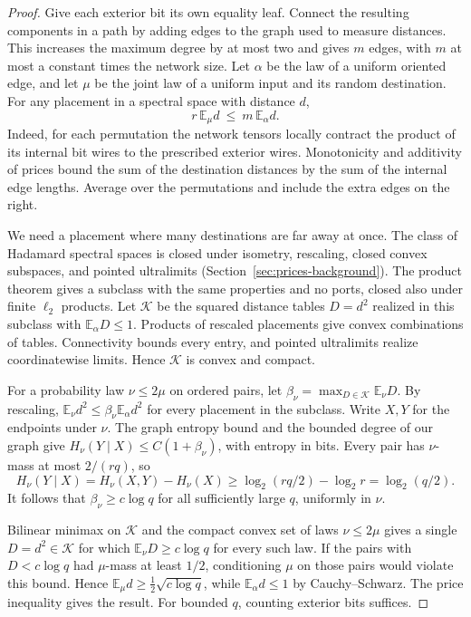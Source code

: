 \begin{proof}
Give each exterior bit its own equality leaf. Connect the resulting
components in a path by adding edges to the graph used to measure
distances. This increases the maximum degree by at most two and gives
\(m\) edges, with \(m\) at most a constant times the network size.
Let \(\alpha\) be the law of a uniform oriented edge, and let \(\mu\)
be the joint law of a uniform input and its random destination.
For any placement in a spectral space with distance \(d\),
\[
                    r\,\mathbb E_\mu d\ \le\ m\,\mathbb E_\alpha d .
\]
Indeed, for each permutation the network tensors locally contract
the product of its internal bit wires to the prescribed exterior
wires. Monotonicity and additivity of prices bound the sum of the
destination distances by the sum of the internal edge lengths.
Average over the permutations and include the extra edges on the right.

We need a placement where many destinations are far away at once.
The class of Hadamard spectral spaces is closed under isometry,
rescaling, closed convex subspaces, and pointed ultralimits
(Section~\ref{sec:prices-background}). The product theorem
\cite[Theorem~]{oaP} gives a subclass with the same
properties and no ports, closed also under finite \(\ell_2\) products.
Let \(\mathcal K\) be the squared distance tables \(D=d^2\) realized
in this subclass with \(\mathbb E_\alpha D\le1\). Products of rescaled
placements give convex combinations of tables. Connectivity bounds
every entry, and pointed ultralimits realize coordinatewise limits.
Hence \(\mathcal K\) is convex and compact.

For a probability law \(\nu\le 2\mu\) on ordered pairs, let
\(\beta_\nu=\max_{D\in\mathcal K}\mathbb E_\nu D\). By rescaling,
\(\mathbb E_\nu d^2\le\beta_\nu\mathbb E_\alpha d^2\) for every
placement in the subclass. Write \(X,Y\) for the endpoints under
\(\nu\). The graph entropy bound \cite[Corollary~]{oaP}
and the bounded degree of our graph give
\(H_\nu(Y\mid X)\le C(1+\beta_\nu)\), with entropy in bits.
Every pair has \(\nu\)-mass at most \(2/(rq)\), so
\[
    H_\nu(Y\mid X)=H_\nu(X,Y)-H_\nu(X)
               \ge \log_2(rq/2)-\log_2 r=\log_2(q/2).
\]
It follows that \(\beta_\nu\ge c\log q\) for all sufficiently large
\(q\), uniformly in \(\nu\).

Bilinear minimax on \(\mathcal K\) and the compact convex set of
laws \(\nu\le2\mu\) gives a single \(D=d^2\in\mathcal K\) for which
\(\mathbb E_\nu D\ge c\log q\) for every such law. If the pairs with
\(D<c\log q\) had \(\mu\)-mass at least \(1/2\), conditioning \(\mu\)
on those pairs would violate this bound. Hence
\(\mathbb E_\mu d\ge \tfrac12\sqrt{c\log q}\), while
\(\mathbb E_\alpha d\le1\) by Cauchy--Schwarz. The price inequality
gives the result. For bounded \(q\), counting exterior bits suffices.
\end{proof}

